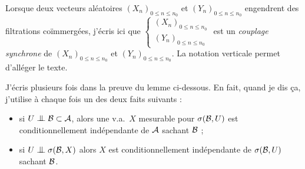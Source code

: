 \documentclass[12pt,a4paper]{article}
\begin{document}
\begin{appendices}

Lorsque deux  vecteurs aléatoires ${(X_n)}_{0 \leq n \leq n_0}$ et ${(Y_n)}_{0 \leq n \leq n_0}$ 
engendrent des filtrations co\"immergées, j'écris ici que 
$\left\{\begin{smallmatrix} {(X_n)}_{0 \leq n \leq n_0} \\ 
{(Y_n)}_{0 \leq n \leq n_0}
\end{smallmatrix}\right.$  
est un \emph{couplage synchrone} de 
${(X_n)}_{0 \leq n \leq n_0}$ et ${(Y_n)}_{0 \leq n \leq n_0}$. 
La notation verticale permet d'alléger le texte. 

J'écris plusieurs fois \fg{} dans la preuve du lemme ci-dessous. 
En fait, quand je dis ça, j'utilise à chaque fois un des deux faits suivants :
\begin{itemize}
\item si $U \indep {\cal B} \subset {\cal A}$, 
alors une v.a.\ $X$ mesurable pour $\sigma({\cal B}, U)$ est conditionnellement 
indépendante de ${\cal A}$ sachant ${\cal B}$ ;

\item si $U \indep \sigma({\cal B}, X)$ alors $X$ est  conditionnellement 
indépendante de $\sigma({\cal B}, U)$ sachant ${\cal B}$.  
\end{itemize}


\end{appendices}
\end{document}
